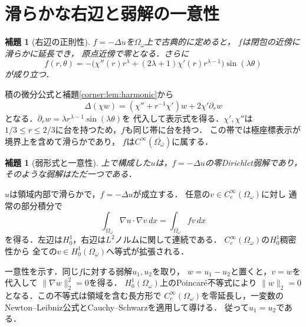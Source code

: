 \documentclass[a5paper,10pt,onecolumn]{jsarticle}
\makeatletter
\theoremstyle{mathnotetheorem}
\newtheorem{lemma}[theorem]{補題}
\renewcommand{\proofname}{証明}
\renewenvironment{proof}[1][\proofname]{%
  \par\pushQED{\qed}\normalfont\topsep4\p@\@plus2\p@\relax
  \trivlist\item[\hskip\labelsep\bfseries #1]\ignorespaces
}{\popQED\endtrivlist\@endpefalse}
\makeatother
\begin{document}
\section{滑らかな右辺と弱解の一意性}
\begin{lemma}[右辺の正則性]\label{corner:lem:rhs}
$f=-\Delta u$を$\Omega_\omega$上で古典的に定めると，
$f$は閉包の近傍に滑らかに延長でき，
原点近傍で零となる．さらに
\[
 f(r,\theta)=-\bigl(\chi''(r)r^\lambda
      +(2\lambda+1)\chi'(r)r^{\lambda-1}\bigr)
      \sin(\lambda\theta)
\]
が成り立つ．
\end{lemma}
\begin{proof}
積の微分公式と補題\ref{corner:lem:harmonic}から
\[
 \Delta(\chi w)=(\chi''+r^{-1}\chi')w
                +2\chi'\partial_rw
\]
となる．$\partial_rw=\lambda r^{\lambda-1}\sin(\lambda\theta)$を
代入して表示式を得る．$\chi',\chi''$は
$1/3\le r\le2/3$に台を持つため，$f$も同じ帯に台を持つ．
この帯では極座標表示が境界上を含めて滑らかであり，
$f$は$C^\infty(\overline{\Omega_\omega})$に属する．
\end{proof}

\begin{lemma}[弱形式と一意性]\label{corner:lem:weak}
上で構成した$u$は，$f=-\Delta u$の零Dirichlet弱解であり，
そのような弱解はただ一つである．
\end{lemma}
\begin{proof}
$u$は領域内部で滑らかで，$f=-\Delta u$が成立する．
任意の$v\in C_c^\infty(\Omega_\omega)$に対し
通常の部分積分で
\[
 \int_{\Omega_\omega}\nabla u\cdot\nabla v\,dx
   =\int_{\Omega_\omega}fv\,dx
\]
を得る．左辺は$H_0^1$，右辺は$L^2$ノルムに関して連続である．
$C_c^\infty(\Omega_\omega)$の$H_0^1$稠密性から
全ての$v\in H_0^1(\Omega_\omega)$へ等式が拡張される．

一意性を示す．同じ$f$に対する弱解$u_1,u_2$を取り，
$w=u_1-u_2$と置くと，$v=w$を代入して
$\|\nabla w\|_2^2=0$を得る．
$H_0^1(\Omega_\omega)$上のPoincar\'e不等式により
$\|w\|_2=0$となる．この不等式は領域を含む長方形で
$C_c^\infty(\Omega_\omega)$を零延長し，一変数の
Newton--Leibniz公式とCauchy--Schwarzを適用して導ける．
従って$u_1=u_2$である．
\end{proof}
\end{document}
